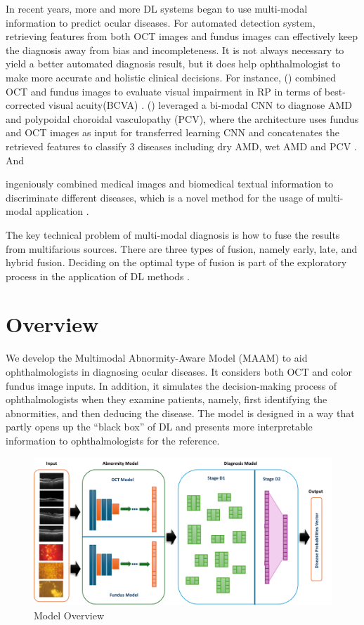 \documentclass{article}
\newcommand{\authyear}[1]{\citeauthor{#1} (\citeyear{#1})}
\begin{document}
	In recent years, more and more DL systems began to use multi-modal information to predict ocular diseases. For automated detection system, retrieving features from both OCT images and fundus images can effectively keep the diagnosis away from bias and incompleteness. It is not always necessary to yield a better automated diagnosis result, but it does help ophthalmologist to make more accurate and holistic clinical decisions. For instance, \authyear{liu2023prediction} combined OCT and fundus images to evaluate visual impairment in RP in terms of best-corrected visual acuity(BCVA) \autocite{liu2023prediction}. \authyear{Xu2021} leveraged a bi-modal CNN to diagnose AMD and polypoidal choroidal vasculopathy (PCV), where the architecture uses fundus and OCT images as input for transferred learning CNN and concatenates the retrieved features to classify 3 diseases including dry AMD, wet AMD and PCV \autocite{Xu2021}. And \author{Andrearczyk2018} ingeniously combined medical images and biomedical textual information to discriminate different diseases, which is a novel method for the usage of multi-modal application \autocite{Andrearczyk2018}.
	
	The key technical problem of multi-modal diagnosis is how to fuse the results from multifarious sources. There are three types of fusion, namely early, late, and hybrid fusion. Deciding on the optimal type of fusion is part of the exploratory process in the application of DL methods \autocite{Ichhpujani_Thakur_2021}.
	
	
	
	\section{Overview}
	\label{sec:overview}
	
	We develop the Multimodal Abnormity-Aware Model (MAAM) to aid ophthalmologists in diagnosing ocular diseases. It considers both OCT and color fundus image inputs. In addition, it simulates the decision-making process of ophthalmologists when they examine patients, namely, first identifying the abnormities, and then deducing the disease. The model is designed in a way that partly opens up the ``black box'' of DL and presents more interpretable information to ophthalmologists for the reference. 
	
	\begin{figure}[htbp]
		\centering
		\includegraphics[width=\linewidth]{Figs/model_overview.pdf}
		\caption{Model Overview}
		\vspace{0.3cm}
		\label{fig:3_parts}
	\end{figure}
	
\end{document}
